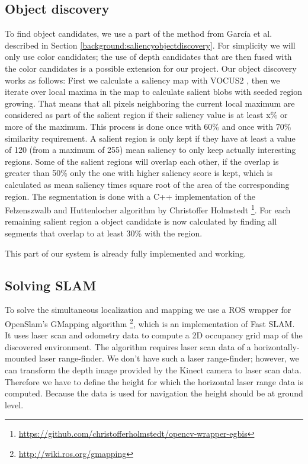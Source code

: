 \documentclass[a4paper,11pt,english]{article}
\begin{document}
\subsection{Object discovery}
\label{system:obj_discovery}
To find object candidates, we use a part of the method from García et al. described in Section \ref{background:saliencyobjectdiscovery}.
For simplicity we will only use color candidates; the use of depth candidates that are then fused with the color candidates is a possible extension for our project.
Our object discovery works as follows: First we calculate a saliency map with VOCUS2 \cite{frintrop2015traditional}, then we iterate over local maxima in the map to calculate salient blobs with seeded region growing.
That means that all pixels neighboring the current local maximum are considered as part of the salient region if their saliency value is at least x\% or more of the maximum.
This process is done once with 60\% and once with 70\% similarity requirement.
A salient region is only kept if they have at least a value of 120 (from a maximum of 255) mean saliency to only keep actually interesting regions.
Some of the salient regions will overlap each other, if the overlap is greater than 50\% only the one with higher saliency score is kept, which is calculated as mean saliency times square root of the area of the corresponding region.
The segmentation is done with a C++ implementation of the Felzenszwalb and Huttenlocher algorithm \cite{felzenszwalb2004efficient} by Christoffer Holmstedt \footnote{\url{https://github.com/christofferholmstedt/opencv-wrapper-egbis}}.
For each remaining salient region a object candidate is now calculated by finding all segments that overlap to at least 30\% with the region.

This part of our system is already fully implemented and working.

\subsection{Solving SLAM}
\label{system:slam}
To solve the simultaneous localization and mapping we use a ROS wrapper for OpenSlam's GMapping algorithm \footnote{\url{http://wiki.ros.org/gmapping}}, which is an implementation of Fast SLAM.
It uses laser scan and odometry data to compute a 2D occupancy grid map of the discovered environment.
The algorithm requires laser scan data of a horizontally-mounted laser range-finder.
We don't have such a laser range-finder; however, we can transform the depth image provided by the Kinect camera to laser scan data.
Therefore we have to define the height for which the horizontal laser range data is computed.
Because the data is used for navigation the height should be at ground level.
\end{document}
